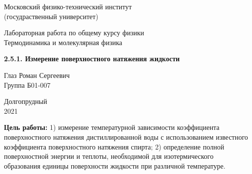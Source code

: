 \documentclass[a4paper, 12pt]{article} %
\begin{document}


\begin{titlepage}

	\newpage
	\begin{center}
		\normalsize Московский физико-технический институт \\(госудраственный университет)
	\end{center}

	\vspace{6em}

	\begin{center}
		\Large Лабораторная работа по общему курсу физики\\Термодинамика и молекулярная физика
	\end{center}

	\vspace{1em}

	\begin{center}
		\Large \textbf{2.5.1. Измерение поверхностного натяжения жидкости }
	\end{center}

	\vspace{2em}

	\begin{center}
		\large Глаз Роман Сергеевич\\
		Группа Б01-007
	\end{center}

	\vspace{\fill}

	\begin{center}
		Долгопрудный \\2021
	\end{center}
	
\end{titlepage}



	\thispagestyle{empty}
	\newpage
	\tableofcontents
	\newpage
	\setcounter{page}{1}



\textbf{Цель работы:} 1) измерение температурной зависимости коэффициента поверхностного натяжения дистиллированной воды с использованием известного коэффициента поверхностного натяжения спирта; 2) определение полной поверхностной энергии и теплоты, необходимой для изотермического образования единицы поверхности жидкости при различной температуре.\\
\end{document}
